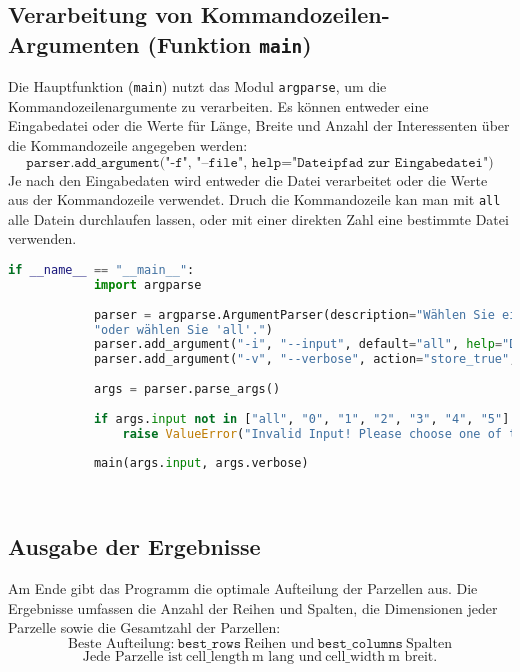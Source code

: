 \documentclass[a4paper,10pt,ngerman]{scrartcl}
\begin{document}
	\subsection{Verarbeitung von Kommandozeilen-Argumenten (Funktion \texttt{main})}
	
	Die Hauptfunktion (\texttt{main}) nutzt das Modul \texttt{argparse}, um die Kommandozeilenargumente zu verarbeiten. Es können entweder eine Eingabedatei oder die Werte für Länge, Breite und Anzahl der Interessenten über die Kommandozeile angegeben werden:
	\[
	\texttt{parser.add\_argument("-f", "--file", help="Dateipfad zur Eingabedatei")}
	\]
	Je nach den Eingabedaten wird entweder die Datei verarbeitet oder die Werte aus der Kommandozeile verwendet. Druch die Kommandozeile kan man mit \texttt{all} alle Datein durchlaufen lassen, oder mit einer direkten Zahl eine bestimmte Datei verwenden. 
	
	\begin{lstlisting}[language=Python, caption=Verarbeitung der Kommandozeilen-Argumente]
		if __name__ == "__main__":
			import argparse
			
			parser = argparse.ArgumentParser(description="Wählen Sie eine Beispielaufgabe mit ihrer Nummer "
			"oder wählen Sie 'all'.")
			parser.add_argument("-i", "--input", default="all", help="Dateipfad zur Eingabedatei")
			parser.add_argument("-v", "--verbose", action="store_true", help="Ausführliche Ausgaben anzeigen")
			
			args = parser.parse_args()
			
			if args.input not in ["all", "0", "1", "2", "3", "4", "5"]:
				raise ValueError("Invalid Input! Please choose one of the following: 0, 1, 2, 3, 4, 5, all")
			
			main(args.input, args.verbose)

		
	\end{lstlisting}
	
	\subsection{Ausgabe der Ergebnisse}
	
	Am Ende gibt das Programm die optimale Aufteilung der Parzellen aus. Die Ergebnisse umfassen die Anzahl der Reihen und Spalten, die Dimensionen jeder Parzelle sowie die Gesamtzahl der Parzellen:
	\[
	\text{Beste Aufteilung:} \ \texttt{best\_rows} \ \text{Reihen und} \ \texttt{best\_columns} \ \text{Spalten}
	\]
	\[
	\text{Jede Parzelle ist} \ \text{cell\_length} \ \text{m lang und} \ \text{cell\_width} \ \text{m breit.}
	\]
	
\end{document}
